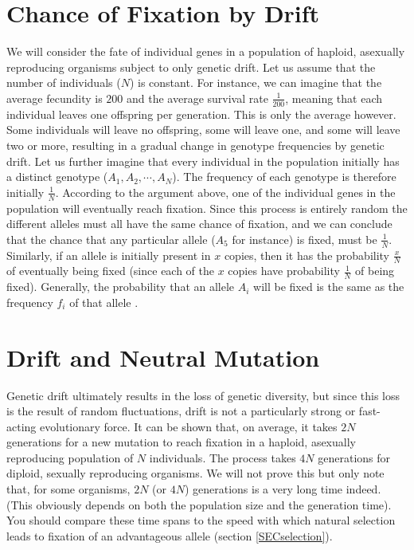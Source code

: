 \documentclass[11pt,a4paper]{book}
\begin{document}
\section{Chance of Fixation by Drift}

We will consider the fate of individual genes in a population of haploid, asexually reproducing organisms subject to only genetic drift. Let us assume that the number of individuals ($N$) is constant. For instance, we can imagine that the average  fecundity is $200$ and the average  survival rate $\frac{1}{200}$, meaning that each individual leaves one offspring per generation. This is only the average however. Some individuals will leave no offspring, some will leave one, and some will leave two or more, resulting in a gradual change in genotype frequencies by genetic drift. Let us further imagine that every individual in the population initially has a distinct genotype ($A_1, A_2, \cdots, A_N$). The  frequency of each genotype is therefore initially $\frac{1}{N}$. According to the argument above, one of the individual genes in the population will eventually reach fixation. Since this process is entirely random the different alleles must all have the same chance of fixation, and we can conclude that the chance that any particular allele ($A_5$ for instance) is fixed, must be $\frac{1}{N}$. Similarly, if an allele is initially present in $x$ copies, then it has the probability $\frac{x}{N}$ of eventually being fixed (since each of the $x$ copies have probability $\frac{1}{N}$ of being fixed). Generally, the probability that an allele $A_i$ will be fixed  is the same as the frequency $f_i$ of that allele . 

\section{Drift and Neutral  Mutation\label{SECdriftmut}}

Genetic drift ultimately results in the loss of genetic diversity, but since this loss is the result of random fluctuations, drift is not a particularly strong or fast-acting evolutionary force. It can be shown that, on average, it takes $2N$ generations for a new mutation to reach fixation in a haploid, asexually reproducing population of $N$ individuals.  The process takes $4N$ generations for diploid, sexually reproducing organisms. We will not prove this but only note that, for some organisms, $2N$ (or $4N$) generations is a very long time indeed.  (This obviously depends on both the population size and the generation time).  You should compare these time spans to the speed with which  natural selection leads to  fixation of an advantageous allele (section \ref{SECselection}). 
\end{document}
